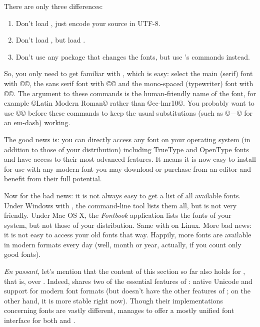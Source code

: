 \documentclass{lltxdoc}
\begin{document}
There are only three differences:
\begin{enumerate}
  \item Don't load , just encode your source in UTF-8.
  \item Don't load , but load .
  \item Don't use any package that changes the fonts, but use 's
    commands instead.
\end{enumerate}
So, you only need to get familiar with , which is
easy: select the main (serif) font with ©\setmainfont©, the sans serif font
with ©\setsansfont© and the mono-spaced (typewriter) font with ©\setmonofont©.
The argument to these commands is the human-friendly name of the font, for
example ©Latin Modern Roman© rather than ©ec-lmr10©. You probably want to use
©© before these commands to keep the usual
\tex substitutions (such as ©---© for an em-dash) working.

The good news is: you can directly access any font on your operating system
(in addition to those of your \tex distribution) including TrueType and
OpenType fonts and have access to their most advanced features. It means it
is now easy to install for use with \lualatex any modern font you may download
or purchase from an editor and benefit from their full potential.

Now for the bad news: it is not always easy to get a list of all available
fonts. Under Windows with \texlive, the command-line tool  lists
them all, but is not very friendly. Under Mac OS X, the \emph{Fontbook}
application lists the fonts of your system, but not those of your \tex
distribution. Same with  on Linux. More bad news: it is not easy
to access your old fonts that way. Happily, more fonts are available in modern
formats every day (well, month or year, actually, if you count only good
fonts).

\emph{En passant}, let's mention that the content of this section so far also
holds for \xelatex, that is, \latex over \xetex. Indeed, \xetex shares two of
the essential features of \luatex: native Unicode and support for modern font
formats (but doesn't have the other features of \luatex; on the other hand, it
is more stable right now). Though their implementations concerning fonts are
vastly different,  manages to offer a mostly unified font
interface for both \xelatex and \lualatex.

\medskip
\end{document}
